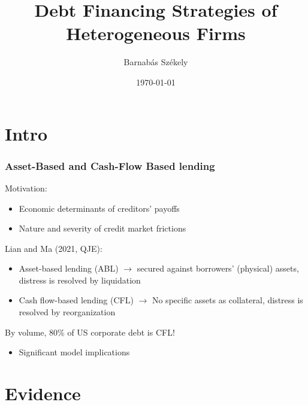 \documentclass[notes]{beamer}
\title[]{Debt Financing Strategies of Heterogeneous Firms} %
\author{Barnab\'as Sz\'ekely} %
\date{\today } %
\begin{document}
\renewcommand{\arraystretch}{1.4}

\begin{frame}
\titlepage %
\end{frame}


\section{Intro}

\begin{frame}[label=slide2]
\frametitle{Asset-Based and Cash-Flow Based lending}
Motivation: 
\begin{itemize}
\item Economic determinants of creditors' payoffs 
\item Nature and severity of credit market frictions
\end{itemize} \vspace{4mm} 
Lian and Ma (2021, QJE): 
\begin{itemize}
\item Asset-based lending (ABL)  $\rightarrow$ secured against borrowers' (physical) assets, distress is resolved by liquidation
\item Cash flow-based lending (CFL)  $\rightarrow$ No specific assets as collateral, distress is resolved by reorganization
\end{itemize}
By volume, 80\% of US corporate debt is CFL! 
\begin{itemize}
\item Significant model implications
\end{itemize}


\end{frame}

\section{Evidence}
\end{document}
